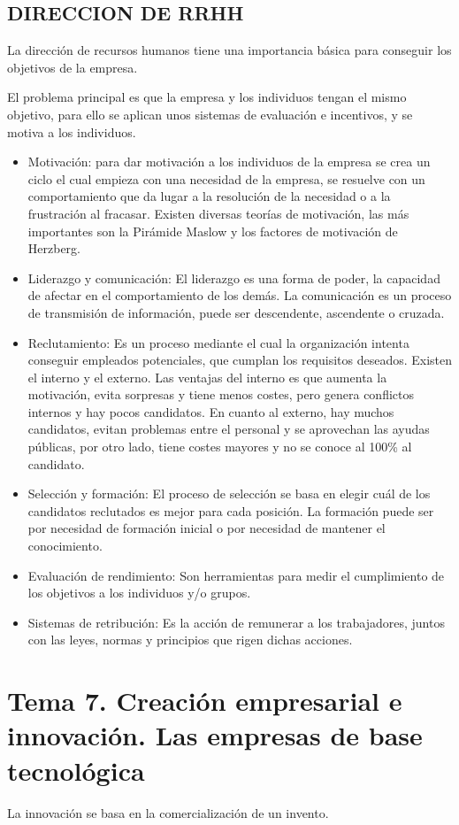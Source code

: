 \documentclass[12pt, twoside, openright]{report} %
\begin{document}
\section{DIRECCION DE RRHH}
La dirección de recursos humanos tiene una importancia básica para conseguir los objetivos de la
empresa.

El problema principal es que la empresa y los individuos tengan el mismo objetivo, para ello se
aplican unos sistemas de evaluación e incentivos, y se motiva a los individuos.
\begin{itemize}
	\item Motivación: para dar motivación a los individuos de la empresa se crea un ciclo el cual empieza
con una necesidad de la empresa, se resuelve con un comportamiento que da lugar a la
resolución de la necesidad o a la frustración al fracasar. Existen diversas teorías de motivación,
las más importantes son la Pirámide Maslow y los factores de motivación de Herzberg.
	\item Liderazgo y comunicación: El liderazgo es una forma de poder, la capacidad de afectar en el
comportamiento de los demás. La comunicación es un proceso de transmisión de información,
puede ser descendente, ascendente o cruzada.
	\item Reclutamiento: Es un proceso mediante el cual la organización intenta conseguir empleados
potenciales, que cumplan los requisitos deseados. Existen el interno y el externo. Las ventajas
del interno es que aumenta la motivación, evita sorpresas y tiene menos costes, pero genera
conflictos internos y hay pocos candidatos. En cuanto al externo, hay muchos candidatos,
evitan problemas entre el personal y se aprovechan las ayudas públicas, por otro lado, tiene
costes mayores y no se conoce al 100\% al candidato.
	\item Selección y formación: El proceso de selección se basa en elegir cuál de los candidatos
reclutados es mejor para cada posición. La formación puede ser por necesidad de formación
inicial o por necesidad de mantener el conocimiento.
	\item Evaluación de rendimiento: Son herramientas para medir el cumplimiento de los objetivos a
los individuos y/o grupos.
	\item Sistemas de retribución: Es la acción de remunerar a los trabajadores, juntos con las leyes,
normas y principios que rigen dichas acciones.
\end{itemize}



\chapter{Tema 7. Creación empresarial e innovación. Las empresas de base tecnológica}
La innovación se basa en la comercialización de un invento.
\end{document}

